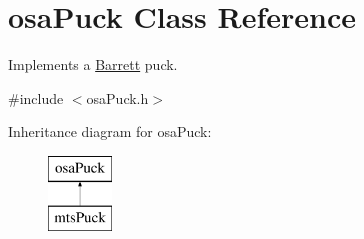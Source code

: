 \hypertarget{classosa_puck}{\section{osa\-Puck Class Reference}
\label{classosa_puck}
}


Implements a \hyperlink{struct_barrett}{Barrett} puck.  




{\ttfamily \#include $<$osa\-Puck.\-h$>$}

Inheritance diagram for osa\-Puck\-:\begin{figure}[H]
\begin{center}
\leavevmode
\includegraphics[height=2.000000cm]{d0/dfa/classosa_puck}
\end{center}
\end{figure}
